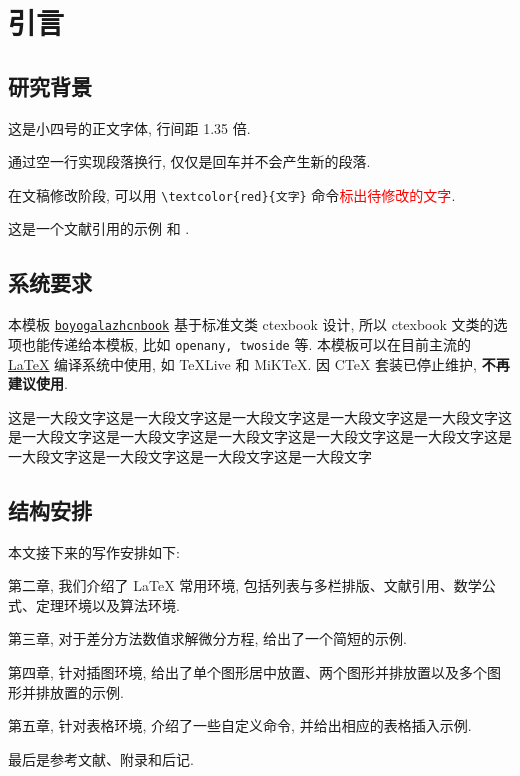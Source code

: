 

\chapter{引言}\label{chap:Intro}

\section{研究背景}\label{sec:background}

这是小四号的正文字体, 行间距 1.35 倍.

通过空一行实现段落换行, 仅仅是回车并不会产生新的段落.

在文稿修改阶段, 可以用 \verb|\textcolor{red}{文字}| 命令\textcolor{red}{标出待修改的文字}.

这是一个文献引用的示例 \cite{Tadmor2012} 和 \cite{LiLiu1997,Adams2003,TreWei2014}.

\section{系统要求}
本模板 \href{https://github.com/boyogala/boyogalazhcnbook}{\texttt{boyogalazhcnbook}} 基于标准文类 ctexbook 设计, 所以 ctexbook 文类的选项也能传递给本模板, 比如 \lstinline{openany, twoside} 等. 本模板可以在目前主流的 \href{https://en.wikibooks.org/wiki/LaTeX/Introduction}{\LaTeX{}} 编译系统中使用, 如 \TeX{}Live 和 MiK\TeX{}. 因 C\TeX{} 套装已停止维护, \textbf{不再建议使用}.

这是一大段文字这是一大段文字这是一大段文字这是一大段文字这是一大段文字这是一大段文字这是一大段文字这是一大段文字这是一大段文字这是一大段文字这是一大段文字这是一大段文字这是一大段文字这是一大段文字


\section{结构安排}

本文接下来的写作安排如下:

第二章, 我们介绍了 LaTeX 常用环境, 包括列表与多栏排版、文献引用、数学公式、定理环境以及算法环境.

第三章, 对于差分方法数值求解微分方程, 给出了一个简短的示例.

第四章, 针对插图环境, 给出了单个图形居中放置、两个图形并排放置以及多个图形并排放置的示例.

第五章, 针对表格环境, 介绍了一些自定义命令, 并给出相应的表格插入示例.

最后是参考文献、附录和后记.

